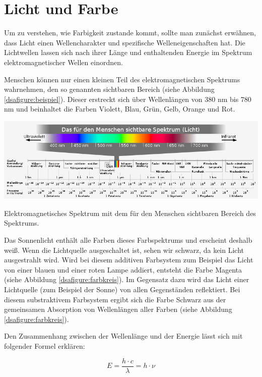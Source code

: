 \section{Licht und Farbe}

Um zu verstehen, wie Farbigkeit zustande kommt, sollte man zunächst erwähnen, dass Licht einen Wellencharakter und spezifische Welleneigenschaften hat. Die Lichtwellen lassen sich nach ihrer Länge und  enthaltenden Energie im Spektrum elektromagnetischer Wellen einordnen.

Menschen können nur einen kleinen Teil des elektromagnetischen Spektrums wahrnehmen, den so genannten sichtbaren Bereich (siehe Abbildung \ref{dsafigure:beispiel}). Dieser erstreckt sich über Wellenlängen von 380 nm bis 780 nm und beinhaltet die Farben Violett, Blau, Grün, Gelb, Orange und Rot. 

\begin{dsafigure}
 \centering
 \includegraphics[width=\columnwidth]{pics/elektromagnetisches_Spektrum.png}
 \caption{Elektromagnetisches Spektrum mit dem für den Menschen sichtbaren Bereich des Spektrums.  \cite{elektromagnetisches_Spektrum}}
 \label{dsafigure:beispiel}
\end{dsafigure}

Das Sonnenlicht enthält alle Farben dieses Farbspektrums und erscheint deshalb weiß. Wenn die Lichtquelle ausgeschaltet ist, sehen wir schwarz, da kein Licht ausgestrahlt wird. Wird bei diesem additiven Farbsystem zum Beispiel das Licht von einer blauen und einer roten Lampe addiert, entsteht die Farbe Magenta (siehe Abbildung \ref{dsafigure:farbkreis}). Im Gegensatz dazu wird das Licht einer Lichtquelle (zum Beispiel der Sonne) von allen Gegenständen reflektiert. 
Bei diesem substraktivem Farbsystem ergibt sich die Farbe Schwarz aus der gemeinsamen Absorption von Wellenlängen aller Farben (siehe Abbildung \ref{dsafigure:farbkreis}).

Den Zusammenhang zwischen der Wellenlänge und der Energie lässt sich mit folgender Formel erklären:

\begin{equation}
E = \frac{h \cdot c}{\lambda} 
= h \cdot \nu
\end{equation}

